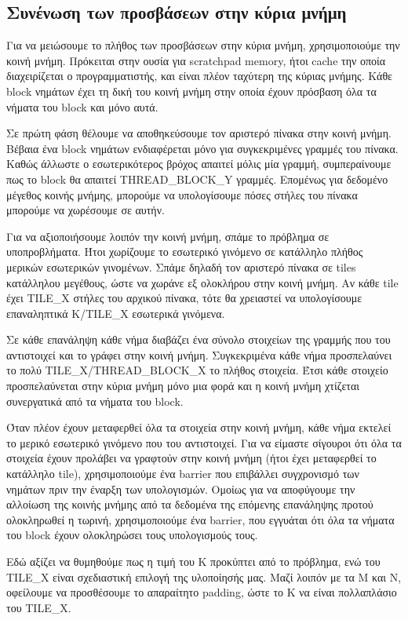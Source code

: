 \documentclass[titlepage]{article}
\begin{document}
\subsection{Συνένωση των προσβάσεων στην κύρια μνήμη}

Για να μειώσουμε το πλήθος των προσβάσεων στην κύρια μνήμη, χρησιμοποιούμε την κοινή μνήμη. Πρόκειται στην ουσία για scratchpad memory, ήτοι cache την οποία διαχειρίζεται ο προγραμματιστής, και είναι πλέον ταχύτερη της κύριας μνήμης. Κάθε block νημάτων έχει τη δική του κοινή μνήμη στην οποία έχουν πρόσβαση όλα τα νήματα του block και μόνο αυτά.

Σε πρώτη φάση θέλουμε να αποθηκεύσουμε τον αριστερό πίνακα στην κοινή μνήμη. Βέβαια ένα block νημάτων ενδιαφέρεται μόνο για συγκεκριμένες γραμμές του πίνακα. Καθώς άλλωστε ο εσωτερικότερος βρόχος απαιτεί μόλις μία γραμμή, συμπεραίνουμε πως το block θα απαιτεί THREAD\_BLOCK\_Y γραμμές. Επομένως για δεδομένο μέγεθος κοινής μνήμης, μπορούμε να υπολογίσουμε πόσες στήλες του πίνακα μπορούμε να χωρέσουμε σε αυτήν.

Για να αξιοποιήσουμε λοιπόν την κοινή μνήμη, σπάμε το πρόβλημα σε υποπροβλήματα. Ήτοι χωρίζουμε το εσωτερικό γινόμενο σε κατάλληλο πλήθος μερικών εσωτερικών γινομένων. Σπάμε δηλαδή τον αριστερό πίνακα σε tiles κατάλληλου μεγέθους, ώστε να χωράνε εξ ολοκλήρου στην κοινή μνήμη. Αν κάθε tile έχει TILE\_X στήλες του αρχικού πίνακα, τότε θα χρειαστεί να υπολογίσουμε επαναληπτικά K/TILE\_X εσωτερικά γινόμενα.

Σε κάθε επανάληψη κάθε νήμα διαβάζει ένα σύνολο στοιχείων της γραμμής που του αντιστοιχεί και το γράφει στην κοινή μνήμη. Συγκεκριμένα κάθε νήμα προσπελαύνει το πολύ TILE\_X/THREAD\_BLOCK\_X το πλήθος στοιχεία. Έτσι κάθε στοιχείο προσπελαύνεται στην κύρια μνήμη μόνο μια φορά και η κοινή μνήμη χτίζεται συνεργατικά από τα νήματα του block.

Όταν πλέον έχουν μεταφερθεί όλα τα στοιχεία στην κοινή μνήμη, κάθε νήμα εκτελεί το μερικό εσωτερικό γινόμενο που του αντιστοιχεί. Για να είμαστε σίγουροι ότι όλα τα στοιχεία έχουν προλάβει να γραφτούν στην κοινή μνήμη (ήτοι έχει μεταφερθεί το κατάλληλο tile), χρησιμοποιούμε ένα barrier που επιβάλλει συγχρονισμό των νημάτων πριν την έναρξη των υπολογισμών. Ομοίως για να αποφύγουμε την αλλοίωση της κοινής μνήμης από τα δεδομένα της επόμενης επανάληψης προτού ολοκληρωθεί η τωρινή, χρησιμοποιούμε ένα barrier, που εγγυάται ότι όλα τα νήματα του block έχουν ολοκληρώσει τους υπολογισμούς τους.

Εδώ αξίζει να θυμηθούμε πως η τιμή του K προκύπτει από το πρόβλημα, ενώ του TILE\_X είναι σχεδιαστική επιλογή της υλοποίησής μας. Μαζί λοιπόν με τα M και N, οφείλουμε να προσθέσουμε το απαραίτητο padding, ώστε το K να είναι πολλαπλάσιο του TILE\_X.
\end{document}
